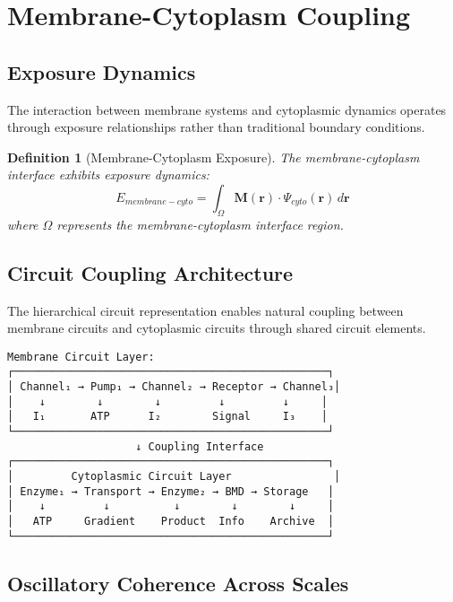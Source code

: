 \documentclass[12pt,a4paper]{article}
\newtheorem{definition}{Definition}
\begin{document}
\section{Membrane-Cytoplasm Coupling}

\subsection{Exposure Dynamics}

The interaction between membrane systems and cytoplasmic dynamics operates through exposure relationships rather than traditional boundary conditions.

\begin{definition}[Membrane-Cytoplasm Exposure]
The membrane-cytoplasm interface exhibits exposure dynamics:
\begin{equation}
E_{membrane-cyto} = \int_{\Omega} \mathbf{M}(\mathbf{r}) \cdot \Psi_{cyto}(\mathbf{r}) \, d\mathbf{r}
\end{equation}
where $\Omega$ represents the membrane-cytoplasm interface region.
\end{definition}

\subsection{Circuit Coupling Architecture}

The hierarchical circuit representation enables natural coupling between membrane circuits and cytoplasmic circuits through shared circuit elements.

\begin{verbatim}
Membrane Circuit Layer:
┌─────────────────────────────────────────────────┐
│ Channel₁ → Pump₁ → Channel₂ → Receptor → Channel₃│
│    ↓        ↓        ↓         ↓         ↓     │
│   I₁       ATP      I₂        Signal     I₃    │
└─────────────────────────────────────────────────┘
                    ↓ Coupling Interface
┌─────────────────────────────────────────────────┐
│         Cytoplasmic Circuit Layer                │
│ Enzyme₁ → Transport → Enzyme₂ → BMD → Storage   │
│    ↓         ↓          ↓        ↓        ↓     │
│   ATP     Gradient    Product  Info    Archive  │
└─────────────────────────────────────────────────┘
\end{verbatim}

\subsection{Oscillatory Coherence Across Scales}
\end{document}
